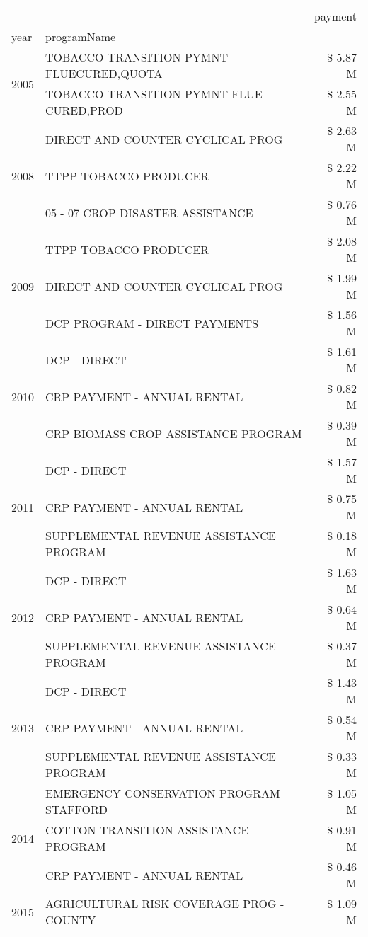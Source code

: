 \begin{tabular}{llr}
\toprule
 &  & payment \\
year & programName &  \\
\midrule
\multirow[t]{2}{*}{2005} & TOBACCO TRANSITION PYMNT-FLUECURED,QUOTA & \$ 5.87 M \\
 & TOBACCO TRANSITION PYMNT-FLUE CURED,PROD & \$ 2.55 M \\
\cline{1-3}
\multirow[t]{3}{*}{2008} & DIRECT AND COUNTER CYCLICAL PROG & \$ 2.63 M \\
 & TTPP TOBACCO PRODUCER & \$ 2.22 M \\
 & 05 - 07 CROP DISASTER ASSISTANCE & \$ 0.76 M \\
\cline{1-3}
\multirow[t]{3}{*}{2009} & TTPP TOBACCO PRODUCER & \$ 2.08 M \\
 & DIRECT AND COUNTER CYCLICAL PROG & \$ 1.99 M \\
 & DCP PROGRAM - DIRECT PAYMENTS & \$ 1.56 M \\
\cline{1-3}
\multirow[t]{3}{*}{2010} & DCP - DIRECT & \$ 1.61 M \\
 & CRP PAYMENT - ANNUAL RENTAL & \$ 0.82 M \\
 & CRP BIOMASS CROP ASSISTANCE PROGRAM & \$ 0.39 M \\
\cline{1-3}
\multirow[t]{3}{*}{2011} & DCP - DIRECT & \$ 1.57 M \\
 & CRP PAYMENT - ANNUAL RENTAL & \$ 0.75 M \\
 & SUPPLEMENTAL REVENUE ASSISTANCE PROGRAM & \$ 0.18 M \\
\cline{1-3}
\multirow[t]{3}{*}{2012} & DCP - DIRECT & \$ 1.63 M \\
 & CRP PAYMENT - ANNUAL RENTAL & \$ 0.64 M \\
 & SUPPLEMENTAL REVENUE ASSISTANCE PROGRAM & \$ 0.37 M \\
\cline{1-3}
\multirow[t]{3}{*}{2013} & DCP - DIRECT & \$ 1.43 M \\
 & CRP PAYMENT - ANNUAL RENTAL & \$ 0.54 M \\
 & SUPPLEMENTAL REVENUE ASSISTANCE PROGRAM & \$ 0.33 M \\
\cline{1-3}
\multirow[t]{3}{*}{2014} & EMERGENCY CONSERVATION PROGRAM STAFFORD & \$ 1.05 M \\
 & COTTON TRANSITION ASSISTANCE PROGRAM & \$ 0.91 M \\
 & CRP PAYMENT - ANNUAL RENTAL & \$ 0.46 M \\
\cline{1-3}
\multirow[t]{3}{*}{2015} & AGRICULTURAL RISK COVERAGE PROG - COUNTY & \$ 1.09 M \\

\end{tabular}
